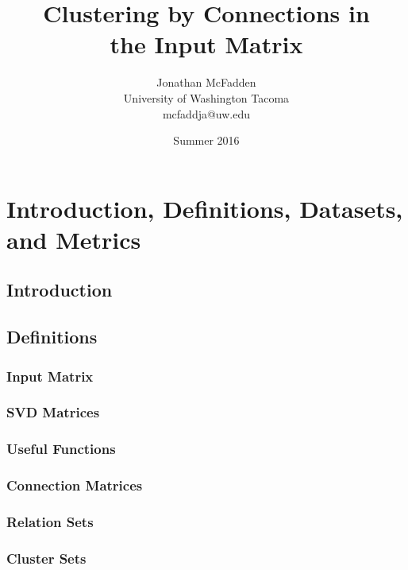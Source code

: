 \documentclass{book}[12pt]
\title{Clustering by Connections in \\
the Input Matrix}
\date{Summer 2016}
\author{Jonathan McFadden \\ University of Washington Tacoma \\ mcfaddja@uw.edu}
\numberwithin{equation}{section}
\begin{document}
\maketitle

\tableofcontents


\part{Introduction, Definitions, Datasets, and Metrics}

\chapter{Introduction}



\chapter{Definitions}

\section{Input Matrix}


\section{SVD Matrices}


\section{Useful Functions}


\section{Connection Matrices}


\section{Relation Sets}


\section{Cluster Sets}

\end{document}
